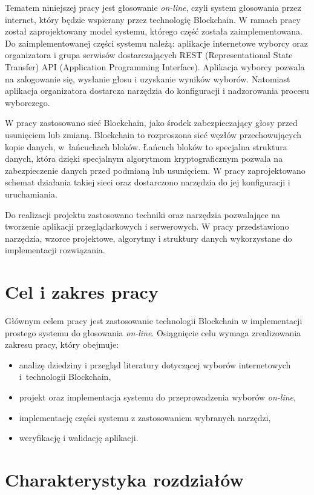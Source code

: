 \documentclass[a4paper,12pt]{book}
\begin{document}
Tematem niniejszej pracy jest głosowanie \textit{on-line}, czyli system głosowania przez internet, który będzie wspierany przez technologię Blockchain. W ramach pracy został zaprojektowany model systemu, którego część została zaimplementowana. Do zaimplementowanej części systemu należą: aplikacje internetowe wyborcy oraz organizatora i grupa serwisów dostarczających REST (Representational State Transfer) API (Application Programming Interface). Aplikacja wyborcy pozwala na zalogowanie się, wysłanie głosu i uzyskanie wyników wyborów. Natomiast aplikacja organizatora dostarcza narzędzia do konfiguracji i nadzorowania procesu wyborczego. 

W pracy zastosowano sieć Blockchain, jako środek zabezpieczający głosy przed usunięciem lub zmianą. Blockchain to rozproszona sieć węzłów przechowujących kopie danych, w~łańcuchach bloków. Łańcuch bloków to specjalna struktura danych, która dzięki specjalnym algorytmom kryptograficznym pozwala na zabezpieczenie danych przed podmianą lub usunięciem. W pracy zaprojektowano schemat działania takiej sieci oraz dostarczono narzędzia do jej konfiguracji i uruchamiania.

Do realizacji projektu zastosowano techniki oraz narzędzia pozwalające na tworzenie aplikacji przeglądarkowych i serwerowych. W pracy przedstawiono narzędzia, wzorce projektowe, algorytmy i struktury danych wykorzystane do implementacji rozwiązania.

\section{Cel i zakres pracy}
Głównym celem pracy jest zastosowanie technologii Blockchain w implementacji prostego systemu do głosowania \textit{on-line}. Osiągnięcie celu wymaga zrealizowania zakresu pracy, który obejmuje:

\begin{itemize}
	\item analizę dziedziny i przegląd literatury dotyczącej wyborów internetowych i~technologii Blockchain,
	\item projekt oraz implementacja systemu do przeprowadzenia wyborów \textit{on-line},
	\item implementację części systemu z zastosowaniem wybranych narzędzi,
	\item weryfikację i walidację aplikacji.
\end{itemize}

\section{Charakterystyka rozdziałów}
\end{document}
